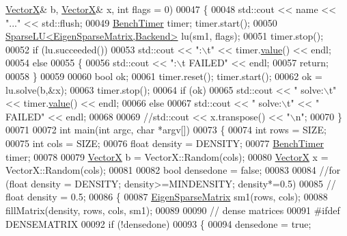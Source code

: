 \begin{DoxyCode}
      \hyperlink{group___core___module}{VectorX}& b, \hyperlink{group___core___module}{VectorX}& x, \textcolor{keywordtype}{int} flags = 0)
00047 \{
00048   std::cout << name << \textcolor{stringliteral}{"..."} << std::flush;
00049   \hyperlink{class_eigen_1_1_bench_timer}{BenchTimer} timer; timer.start();
00050   \hyperlink{group___sparse_l_u___module_class_eigen_1_1_sparse_l_u}{SparseLU<EigenSparseMatrix,Backend>} lu(sm1, flags);
00051   timer.stop();
00052   \textcolor{keywordflow}{if} (lu.succeeded())
00053     std::cout << \textcolor{stringliteral}{":\(\backslash\)t"} << timer.\hyperlink{class_eigen_1_1_bench_timer_a26760f963ed8b64c126159bfea57735e}{value}() << endl;
00054   \textcolor{keywordflow}{else}
00055   \{
00056     std::cout << \textcolor{stringliteral}{":\(\backslash\)t FAILED"} << endl;
00057     \textcolor{keywordflow}{return};
00058   \}
00059 
00060   \textcolor{keywordtype}{bool} ok;
00061   timer.reset(); timer.start();
00062   ok = lu.solve(b,&x);
00063   timer.stop();
00064   \textcolor{keywordflow}{if} (ok)
00065     std::cout << \textcolor{stringliteral}{"  solve:\(\backslash\)t"} << timer.\hyperlink{class_eigen_1_1_bench_timer_a26760f963ed8b64c126159bfea57735e}{value}() << endl;
00066   \textcolor{keywordflow}{else}
00067     std::cout << \textcolor{stringliteral}{"  solve:\(\backslash\)t"} << \textcolor{stringliteral}{" FAILED"} << endl;
00068 
00069   \textcolor{comment}{//std::cout << x.transpose() << "\(\backslash\)n";}
00070 \}
00071 
00072 \textcolor{keywordtype}{int} main(\textcolor{keywordtype}{int} argc, \textcolor{keywordtype}{char} *argv[])
00073 \{
00074   \textcolor{keywordtype}{int} rows = SIZE;
00075   \textcolor{keywordtype}{int} cols = SIZE;
00076   \textcolor{keywordtype}{float} density = DENSITY;
00077   \hyperlink{class_eigen_1_1_bench_timer}{BenchTimer} timer;
00078 
00079   \hyperlink{group___core___module}{VectorX} b = VectorX::Random(cols);
00080   \hyperlink{group___core___module}{VectorX} x = VectorX::Random(cols);
00081 
00082   \textcolor{keywordtype}{bool} densedone = \textcolor{keyword}{false};
00083 
00084   \textcolor{comment}{//for (float density = DENSITY; density>=MINDENSITY; density*=0.5)}
00085 \textcolor{comment}{//   float density = 0.5;}
00086   \{
00087     \hyperlink{group___sparse_core___module}{EigenSparseMatrix} sm1(rows, cols);
00088     fillMatrix(density, rows, cols, sm1);
00089 
00090     \textcolor{comment}{// dense matrices}
00091 \textcolor{preprocessor}{    #ifdef DENSEMATRIX}
00092     \textcolor{keywordflow}{if} (!densedone)
00093     \{
00094       densedone = \textcolor{keyword}{true};

\end{DoxyCode}
